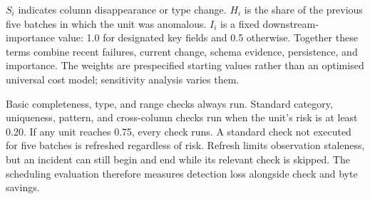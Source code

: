 $S_i$ indicates column disappearance or type change. $H_i$ is the share of the previous five batches in which the unit was anomalous. $I_i$ is a fixed downstream-importance value: 1.0 for designated key fields and 0.5 otherwise. Together these terms combine recent failures, current change, schema evidence, persistence, and importance. The weights are prespecified starting values rather than an optimised universal cost model; sensitivity analysis varies them.

Basic completeness, type, and range checks always run. Standard category, uniqueness, pattern, and cross-column checks run when the unit's risk is at least 0.20. If any unit reaches 0.75, every check runs. A standard check not executed for five batches is refreshed regardless of risk. Refresh limits observation staleness, but an incident can still begin and end while its relevant check is skipped. The scheduling evaluation therefore measures detection loss alongside check and byte savings.

